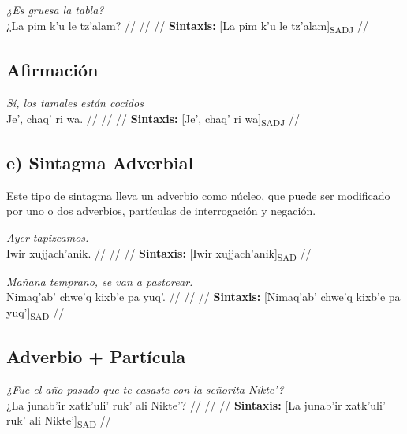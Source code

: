 \documentclass{article}%
\begin{document}
%
\par\medskip%
\ex
\textit{¿Es gruesa la tabla?} \\
\begingl
\gla ¿La pim k’u le tz’alam? //
\glb  //
\glc  //
\glft \textbf{Sintaxis:} [La pim k’u le tz’alam]\textsubscript{SADJ} //
\endgl
\xe
%
\medskip%
\subsection{Afirmación}%
\label{subsec:Afirmacin}%

%
\par\medskip%
\ex
\textit{Sí, los tamales están cocidos} \\
\begingl
\gla Je’, chaq’ ri wa. //
\glb  //
\glc  //
\glft \textbf{Sintaxis:} [Je’, chaq’ ri wa]\textsubscript{SADJ} //
\endgl
\xe
%
\medskip%
\subsection{e) Sintagma Adverbial}%
\label{subsec:e)SintagmaAdverbial}%

%
Este tipo de sintagma lleva un adverbio como núcleo, que puede ser modificado por uno %
o dos adverbios, partículas de interrogación y negación. %
\par\medskip%
\ex
\textit{Ayer tapizcamos.} \\
\begingl
\gla Iwir xujjach’anik. //
\glb  //
\glc  //
\glft \textbf{Sintaxis:} [Iwir xujjach’anik]\textsubscript{SAD} //
\endgl
\xe
%
\medskip%
\par\medskip%
\ex
\textit{Mañana temprano, se van a pastorear.} \\
\begingl
\gla Nimaq’ab’ chwe’q kixb’e pa yuq’. //
\glb  //
\glc  //
\glft \textbf{Sintaxis:} [Nimaq’ab’ chwe’q kixb’e pa yuq’]\textsubscript{SAD} //
\endgl
\xe
%
\medskip%
\subsection{Adverbio + Partícula}%
\label{subsec:Adverbio+Partcula}%

%
\par\medskip%
\ex
\textit{¿Fue el año pasado que te casaste con la señorita Nikte’?} \\
\begingl
\gla ¿La junab’ir xatk’uli’ ruk’ ali Nikte’? //
\glb  //
\glc  //
\glft \textbf{Sintaxis:} [La junab’ir xatk’uli’ ruk’ ali Nikte’]\textsubscript{SAD} //
\endgl
\xe
%
\medskip

%
\end{document}
